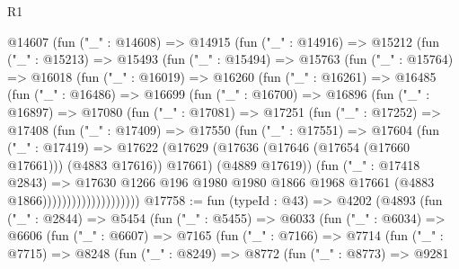 \begin{lexlean}{R1}
\begin{coremodule}
          @14607
            (fun ("_" : @14608) =>
            @14915
              (fun ("_" : @14916) =>
              @15212
                (fun ("_" : @15213) =>
                @15493
                  (fun ("_" : @15494) =>
                  @15763
                    (fun ("_" : @15764) =>
                    @16018
                      (fun ("_" : @16019) =>
                      @16260
                        (fun ("_" : @16261) =>
                        @16485
                          (fun ("_" : @16486) =>
                          @16699
                            (fun ("_" : @16700) =>
                            @16896
                              (fun ("_" : @16897) =>
                              @17080
                                (fun ("_" : @17081) =>
                                @17251
                                  (fun ("_" : @17252) =>
                                  @17408
                                    (fun ("_" : @17409) =>
                                    @17550
                                      (fun ("_" : @17551) =>
                                      @17604
                                        (fun ("_" : @17419) =>
                                        @17622
                                          (@17629
                                            (@17636
                                              (@17646 (@17654 (@17660 @17661)))
                                              (@4883 @17616))
                                            @17661)
                                          (@4889 @17619))
                                        (fun ("_" : @17418 @2843) =>
                                        @17630
                                          @1266
                                          @196
                                          @1980
                                          @1980
                                          @1866
                                          @1968
                                          @17661
                                          (@4883 @1866))))))))))))))))))))
@17758 := fun (typeId : @43) =>
  @4202
    (@4893
      (fun ("_" : @2844) =>
      @5454
        (fun ("_" : @5455) =>
        @6033
          (fun ("_" : @6034) =>
          @6606
            (fun ("_" : @6607) =>
            @7165
              (fun ("_" : @7166) =>
              @7714
                (fun ("_" : @7715) =>
                @8248
                  (fun ("_" : @8249) =>
                  @8772
                    (fun ("_" : @8773) =>
                    @9281

\end{coremodule}
\end{lexlean}
